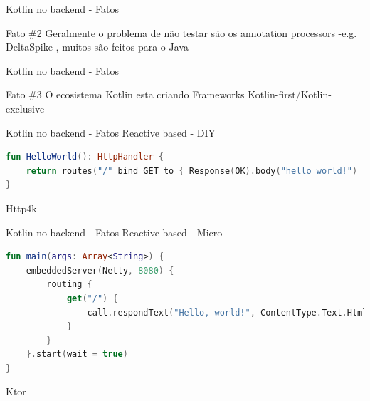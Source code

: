 \documentclass[aspectratio=169]{beamer}
\begin{document}
\begin{frame}{Kotlin no backend - Fatos}

\begin{exampleblock}{Fato \#2}
Geralmente o problema de não testar são os annotation processors -e.g. DeltaSpike-, muitos são feitos para o Java
\end{exampleblock}
\end{frame}

\begin{frame}{Kotlin no backend - Fatos}

\begin{exampleblock}{Fato \#3}
O ecosistema Kotlin esta criando Frameworks Kotlin-first/Kotlin-exclusive
\end{exampleblock}
\end{frame}

\begin{frame}[fragile]{Kotlin no backend - Fatos}
Reactive based - DIY
\begin{lstlisting}[language=Kotlin]
fun HelloWorld(): HttpHandler {
    return routes("/" bind GET to { Response(OK).body("hello world!") })
}
\end{lstlisting}
Http4k
\end{frame}

\begin{frame}[fragile]{Kotlin no backend - Fatos}
Reactive based - Micro
\begin{lstlisting}[language=Kotlin]
fun main(args: Array<String>) {
    embeddedServer(Netty, 8080) {
        routing {
            get("/") {
                call.respondText("Hello, world!", ContentType.Text.Html)
            }
        }
    }.start(wait = true)
}
\end{lstlisting}
Ktor
\end{frame}
\end{document}
